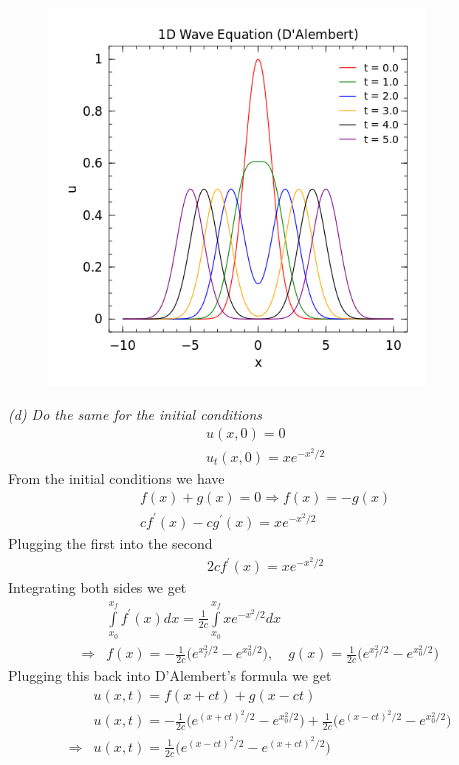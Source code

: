\documentclass[12pt]{article}
\theoremstyle{remark}
\begin{document}
\begin{figure}[H]
\centering
\includegraphics[width=10cm]{HW3_1c.png}
\end{figure}

\vphantom{}\vspace{7cm}

\noindent \textit{(d) Do the same for the initial conditions}
\begin{align*} 
& u(x,0) = 0 \\
& u_t(x,0) = xe^{-x^2/2}
\end{align*}
From the initial conditions we have
\begin{align*}
& f(x) + g(x) = 0 \Rightarrow f(x) = -g(x) \\
& cf^\prime(x) - cg^\prime(x) = xe^{-x^2/2}
\end{align*}
Plugging the first into the second
\begin{align*}
& 2cf^\prime(x) = xe^{-x^2/2}
\end{align*}
Integrating both sides we get
\begin{align*}
& \int\limits_{x_0}^{x_f} f^\prime(x) dx = \frac{1}{2c}\int\limits_{x_0}^{x_f} xe^{-x^2/2} dx \\
\Rightarrow & f(x) = -\frac{1}{2c}\bigg(e^{x_f^2/2} - e^{x_0^2/2}\bigg), \quad g(x) = \frac{1}{2c}\bigg(e^{x_f^2/2} - e^{x_0^2/2}\bigg)
\end{align*}
Plugging this back into D'Alembert's formula we get
\begin{align*}
& u(x,t) = f(x+ct) + g(x-ct) \\
& u(x,t) = -\frac{1}{2c}\bigg(e^{(x+ct)^2/2} - e^{x_0^2/2}\bigg) + \frac{1}{2c}\bigg(e^{(x-ct)^2/2} - e^{x_0^2/2}\bigg) \\
\Rightarrow & \boxed{u(x,t) = \frac{1}{2c}\bigg(e^{(x-ct)^2/2} - e^{(x+ct)^2/2}\bigg)} 
\end{align*}
\end{document}
